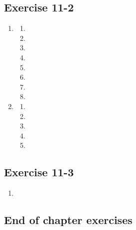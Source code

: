 \subsection{Exercise 11-2} %
 \begin{enumerate}[itemsep=5pt, label=\textbf{\arabic*}. ]
  \item %
\begin{enumerate}[noitemsep, label=\textbf{(\alph*)} ]
\item
\item
\item
\item
\item
\item
\item
\item
\end{enumerate}
\item %
\begin{enumerate}[noitemsep, label=\textbf{(\alph*)} ]

\item
\item
\item
\item
\item
\end{enumerate}

\end{enumerate}
\subsection{Exercise 11-3}
  \begin{enumerate}[itemsep=5pt, label=\textbf{\arabic*}. ]
 \item %
\end{enumerate}

\subsection{End of chapter exercises} %

